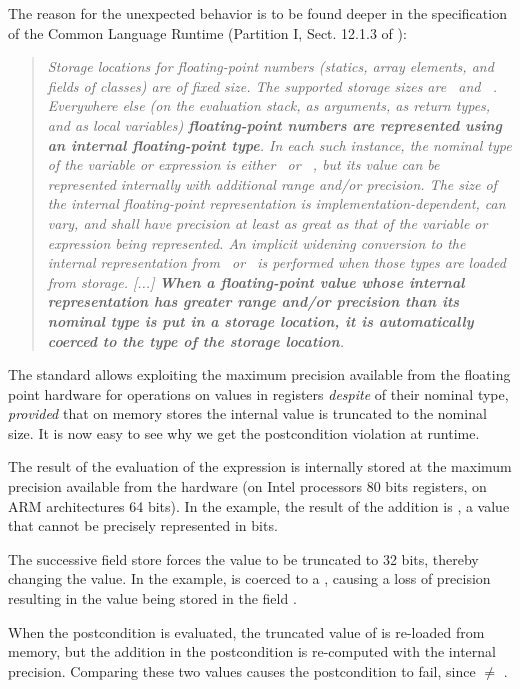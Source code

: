 \documentclass{entcs}
\newcommand{\Float}{\code{float32}\ }
\newcommand{\Double}{\code{float64}\  }
\begin{document}
The reason for the unexpected behavior is to be found deeper in the specification of the Common Language Runtime (Partition I, Sect. 12.1.3 of \cite{CLR}):

\begin{quote}\itshape\small
Storage locations for floating-point numbers (statics, array elements, and fields of classes) are of fixed size. 
The supported storage sizes are \Float and \Double. 
Everywhere else (on the evaluation stack, as arguments, as return types, and as local variables) \textbf{floating-point numbers are represented using an internal floating-point type}. 
In each such instance, the nominal type of the variable or expression is either \Float or \Double, but its value can be represented internally with additional range and/or precision. 
The size of the internal floating-point representation is implementation-dependent, can vary, and shall have precision at least as great as that of the variable or expression being represented. An implicit widening conversion to the internal representation from \Float or \Double is performed when those types are loaded from storage.
[...]
\textbf{When a floating-point value whose internal representation has greater range and/or precision than its nominal type is put in a storage location, it is automatically coerced to the type of the storage location}.
\end{quote}

\noindent
The standard allows exploiting the maximum precision
available from the floating point hardware for operations on values in
registers \emph{despite} of their nominal type, \emph{provided} that on memory stores the internal value is truncated to the nominal size.
It is now easy to see why we get the postcondition violation at runtime.

The result of the evaluation of the expression  is internally stored at the maximum precision available from the hardware (on Intel processors 80 bits registers, on ARM architectures 64 bits).
In the example, the result of the addition is , a
value that cannot be precisely represented in  bits.

The successive field store forces the value to be truncated to 32
bits, thereby changing the value.
In the example,  is coerced to a ,
causing a loss of precision resulting in the value  being stored in the field .

When the postcondition is evaluated,  the truncated value of  is
re-loaded from memory, but the addition in the postcondition is re-computed with the internal precision.
Comparing these two values causes the postcondition to fail, since  $\not=$ .
\end{document}
